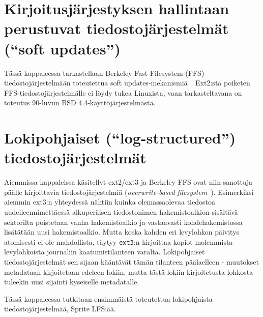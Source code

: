 \section{Kirjoitusjärjestyksen hallintaan perustuvat tiedostojärjestelmät (``soft updates'')}
\label{ChapSoftUpdates}
Tässä kappaleessa tarkastellaan Berkeley Fast Filesystem (FFS)-tiedostojärjestelmään toteutettua soft updates-mekanismiä~\cite{SoftUpdatesFfs}.
Ext2:sta poiketen FFS-tiedostojärjestelmälle ei löydy tukea Linuxista,
vaan tarkasteltavana on toteutus 90-luvun BSD 4.4-käyttöjärjestelmästä.

\section{Lokipohjaiset (``log-structured'') tiedostojärjestelmät}
\label{ChapLogStructured}
Aiemmissa kappaleissa käsitellyt ext2/ext3 ja Berkeley FFS ovat niin sanottuja päälle kirjoittavia tiedostojärjestelmiä (\emph{overwrite-based filesystem}~\cite{Btrfs}).
Esimerkiksi aiemmin ext3:n yhteydessä nähtiin kuinka olemassaolevaa tiedostoa uudelleennimettäessä
alkuperäisen tiedostonimen hakemistoalkion sisältävä sektorilta poistetaan vanha hakemistoalkio
ja vastaavasti kohdehakemistossa lisätätään uusi hakemistoalkio.
Mutta koska kahden eri levylohkon päivitys atomisesti ei ole mahdollista,
täytyy \texttt{ext3}:n kirjoittaa kopiot molemmista levylohkoista journaliin kaatumistilanteen varalta.
Lokipohjaiset tiedostojärjestelmät sen sijaan kääntävät tämän tilanteen päälaelleen - muutokset metadataan kirjoitetaan edeleen lokiin,
mutta tästä lokiin kirjoitetusta lohkosta tuleekin uusi sijainti kyseiselle metadatalle.

Tässä kappaleessa tutkitaan ensimmäistä toteutettua lokipohjaista tiedostojärjestelmää, Sprite LFS:ää.

